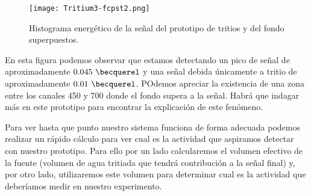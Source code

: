 \begin{figure}[hbtp]
\centering
\texttt{[image: Tritium3-fcpst2.png]}
\caption{Histograma energético de la señal del prototipo de tritios y del fondo superpuestos.\label{tritiofondo}}
\end{figure}

En esta figura podemos observar que estamos detectando un pico de señal de aproximadamente $0.045~\becquerel$ y una señal debida únicamente a tritio de aproximadamente $0.01~\becquerel$. POdemos apreciar la existencia de una zona entre los canales 450 y 700 donde el fondo supera a la señal. Habrá que indagar más en este prototipo para encontrar la explicación de este fenómeno.

Para ver hasta que punto nuestro sistema funciona de forma adecuada podemos realizar un rápido cálculo para ver cual es la actividad que aspiramos detectar con nuestro prototipo. Para ello por un lado calcularemos el volumen efectivo de la fuente (volumen de agua tritiada que tendrá contribución a la señal final) y, por otro lado, utilizaremos este volumen para determinar cual es la actividad que deberíamos medir en nuestro experimento.

